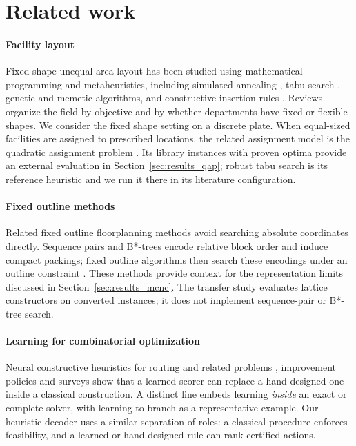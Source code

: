 \documentclass[preprint,12pt,authoryear,nonatbib]{elsarticle}
\begin{document}
\section{Related work}
\label{sec:related}

\paragraph{Facility layout}
Fixed shape unequal area layout has been studied using mathematical programming
and metaheuristics, including simulated annealing \citep{Kirkpatrick1983SA},
tabu search \citep{Glover1989Tabu}, genetic and memetic algorithms, and
constructive insertion rules \citep{gomes2000metaheuristic,Drira2007,singh2006review}.
Reviews \citep{perez2021facility,csahin2020mathematical} organize the field by
objective and by whether departments have fixed or flexible shapes. We consider
the fixed shape setting on a discrete plate. When equal-sized facilities are
assigned to prescribed locations, the related assignment model is the quadratic
assignment problem \citep{Koopmans1957QAP}. Its library instances
with proven optima \citep{Burkard1997QAPLIB} provide an external evaluation in
Section~\ref{sec:results_qap}; robust tabu search \citep{Taillard1991Robust} is
its reference heuristic and we run it there in its literature configuration.

\paragraph{Fixed outline methods}
Related fixed outline floorplanning methods avoid searching absolute coordinates
directly. Sequence pairs \citep{Murata1996SequencePair} and B*-trees
\citep{Chang2000BStar} encode relative block order and induce compact packings;
fixed outline algorithms then search these encodings under an outline constraint
\citep{Adya2003FixedOutline}. These methods provide context for the representation
limits discussed in Section~\ref{sec:results_mcnc}. The transfer study evaluates
lattice constructors on converted instances; it does not implement sequence-pair
or B*-tree search.

\paragraph{Learning for combinatorial optimization}
Neural constructive heuristics for routing and related problems
\citep{Bello2017NCO,Kool2019Attention}, improvement policies
\citep{Wu2021Improvement} and surveys \citep{Bengio2021Horizon,Mazyavkina2021RLCO}
show that a learned scorer can replace a hand designed one inside a
classical construction. A distinct line embeds
learning \emph{inside} an exact or complete solver, with learning to branch
\citep{Gasse2019Branch} as a representative example. Our heuristic decoder uses
a similar separation of roles: a classical procedure enforces feasibility,
and a learned or hand designed rule can rank certified actions.
\end{document}
